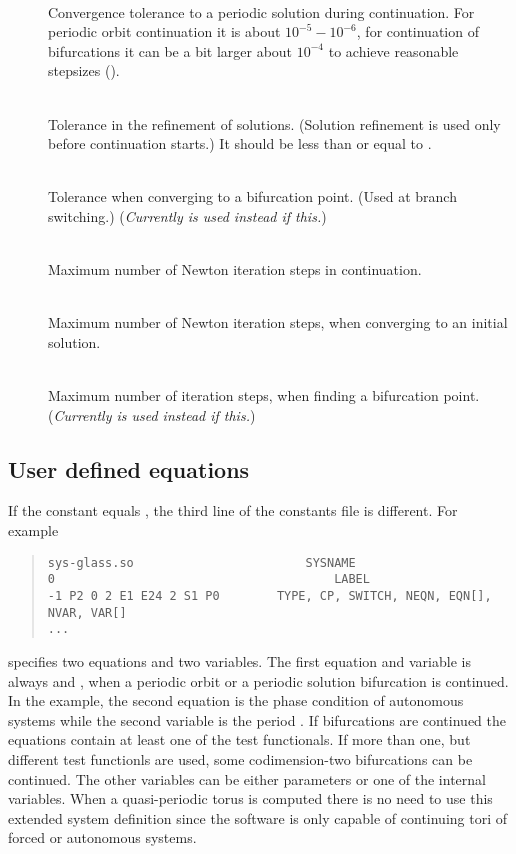 \documentclass[10pt,a4paper]{ddedoc}
\begin{document}
\begin{description}
%
\item[] ~\\
Convergence tolerance to a periodic solution during continuation. For periodic orbit continuation it is about $10^{-5} - 10^{-6}$, for continuation of bifurcations it can be a bit larger about $10^{-4}$ to achieve reasonable stepsizes ().
%
\item[] ~\\
Tolerance in the refinement of solutions. (Solution refinement is used only before continuation starts.) It should be less than or equal to .
%
\item[] ~\\
Tolerance when converging to a bifurcation point. (Used at branch switching.) (\emph{Currently  is used instead if this.})
%
\item[] ~\\
Maximum number of Newton iteration steps in continuation.
%
\item[] ~\\
Maximum number of Newton iteration steps, when converging to an initial solution.
%
\item[] ~\\
Maximum number of iteration steps, when finding a bifurcation point. (\emph{Currently  is used instead if this.})
%
\end{description}

\subsection{User defined equations}
If the  constant equals , the third line of the constants file is different. For example
{ \small \begin{quote} \begin{lstlisting}[basicstyle=\tt,frame=single]
sys-glass.so						SYSNAME
0										LABEL
-1 P2 0 2 E1 E24 2 S1 P0		TYPE, CP, SWITCH, NEQN, EQN[], NVAR, VAR[]
...
\end{lstlisting} \end{quote} } \noindent
specifies two equations and two variables. The first equation and variable is always  and , when a periodic orbit or a periodic solution bifurcation is continued. In the example, the second equation  is the phase condition of autonomous systems while the second variable is the period . If bifurcations are continued the equations contain at least one of the test functionals. If more than one, but different test functionls are used, some codimension-two bifurcations can be continued. The other variables can be either parameters or one of the internal variables. When a quasi-periodic torus is computed there is no need to use this extended system definition since the software is only capable of continuing tori of forced or autonomous systems.
\end{document}
